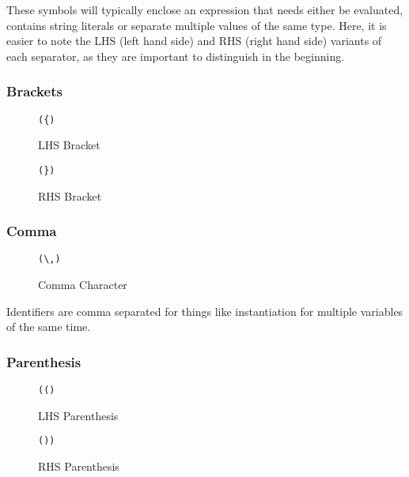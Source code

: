 \documentclass{article}
\begin{document}
\begin{flushleft}
These symbols will typically enclose an expression that needs either be evaluated, contains string literals or separate multiple values of the same type.
Here, it is easier to note the LHS (left hand side) and RHS (right hand side) variants of each separator, as they are important to distinguish in the beginning.

\subsubsection{Brackets}

\begin{figure}[!htpb]
\centering
\begin{Verbatim}[frame=single]
({)
\end{Verbatim}
\caption{LHS Bracket}
\end{figure}


\begin{figure}[!htpb]
\centering
\begin{Verbatim}[frame=single]
(})
\end{Verbatim}
\caption{RHS Bracket}
\end{figure}

\subsubsection{Comma}
\begin{figure}[!htpb]
\centering
\begin{Verbatim}[frame=single]
(\,)
\end{Verbatim}
\caption{Comma Character}
\end{figure}

Identifiers are comma separated for things like instantiation for multiple variables of the same time.

\newpage

\subsubsection{Parenthesis}
\begin{figure}[!htpb]
\centering
\begin{Verbatim}[frame=single]
(()
\end{Verbatim}
\caption{LHS Parenthesis}
\end{figure}


\begin{figure}[!htpb]
\centering
\begin{Verbatim}[frame=single]
())
\end{Verbatim}
\caption{RHS Parenthesis}
\end{figure}



\end{flushleft}
\end{document}
